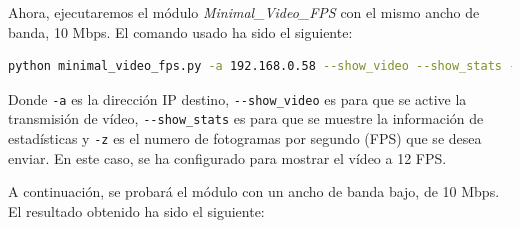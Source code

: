 \newpage

Ahora, ejecutaremos el módulo \textit{Minimal\_Video\_FPS} con el mismo ancho de banda, 10 Mbps. El comando usado ha sido el siguiente:
\begin{lstlisting}[language=bash, basicstyle=\ttfamily\scriptsize]
    python minimal_video_fps.py -a 192.168.0.58 --show_video --show_stats -z 12
\end{lstlisting}
Donde \verb|-a| es la dirección IP destino, \verb|--show_video| es para que se active la transmisión de vídeo, \verb|--show_stats| es para que se muestre la información de estadísticas y \verb|-z| es el numero de fotogramas por segundo (FPS) que se desea enviar. En este caso, se ha configurado para mostrar el vídeo a 12 FPS.

A continuación, se probará el módulo con un ancho de banda bajo, de 10 Mbps. El resultado obtenido ha sido el siguiente:
\vspace{\baselineskip}

